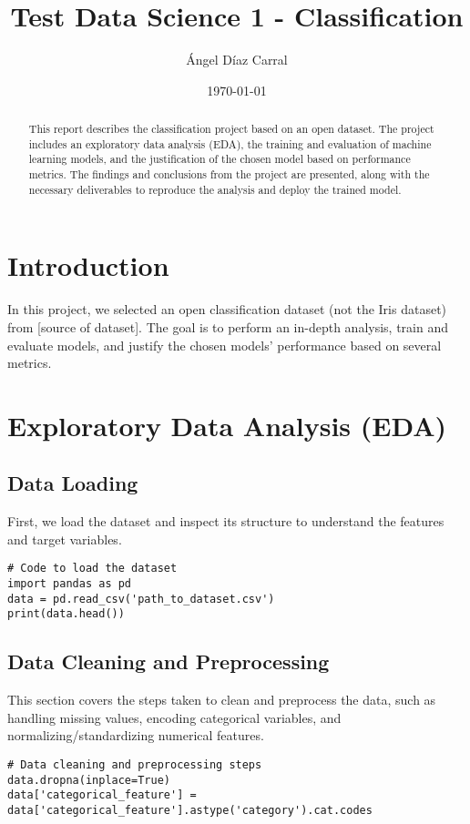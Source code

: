 \documentclass[12pt]{article}
\title{Test Data Science 1 - Classification}
\author{Ángel Díaz Carral}
\date{\today}
\begin{document}
\maketitle

\begin{abstract}
This report describes the classification project based on an open dataset. The project includes an exploratory data analysis (EDA), the training and evaluation of machine learning models, and the justification of the chosen model based on performance metrics. The findings and conclusions from the project are presented, along with the necessary deliverables to reproduce the analysis and deploy the trained model.
\end{abstract}

\section{Introduction}
In this project, we selected an open classification dataset (not the Iris dataset) from [source of dataset]. The goal is to perform an in-depth analysis, train and evaluate models, and justify the chosen models' performance based on several metrics.

\section{Exploratory Data Analysis (EDA)}

\subsection{Data Loading}
First, we load the dataset and inspect its structure to understand the features and target variables.

\begin{verbatim}
# Code to load the dataset
import pandas as pd
data = pd.read_csv('path_to_dataset.csv')
print(data.head())
\end{verbatim}

\subsection{Data Cleaning and Preprocessing}
This section covers the steps taken to clean and preprocess the data, such as handling missing values, encoding categorical variables, and normalizing/standardizing numerical features.

\begin{verbatim}
# Data cleaning and preprocessing steps
data.dropna(inplace=True)
data['categorical_feature'] = data['categorical_feature'].astype('category').cat.codes
\end{verbatim}
\end{document}
